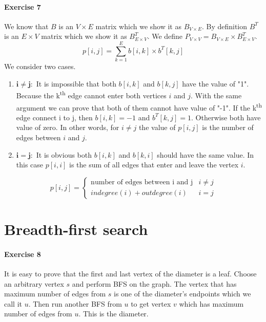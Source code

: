 \documentclass{book}
\begin{document}
	\paragraph{Exercise 7}
	We know that $B$ is an $V \times E$ matrix which we show it as $B_{V \times E}$. By definition $B^T$ is an $E \times V$ matrix which we show it as $B_{E \times V}^T$. We define $P_{V \times V} = B_{V \times E} \times B_{E \times V}^T$.
	\begin{equation*}
		p[i, j] = \sum_{k = 1}^{E}b[i, k] \times b^T[k, j]
	\end{equation*}
	We consider two cases.
	\begin{enumerate}
		\item $\boldsymbol{i \ne j:}$ It is impossible that both $b[i, k]$ and $b[k, j]$ have the value of "1". Because the k\textsuperscript{th} edge cannot enter both vertices $i$ and $j$. With the same argument we can prove that both of them cannot have value of "-1". If the k\textsuperscript{th} edge connect i to j, then $b[i, k] = -1$ and $b^T[k, j] = 1$. Otherwise both have value of zero. In other words, for $i \ne j$ the value of $p[i, j]$ is the number of edges between $i$ and $j$.
		\item $\boldsymbol{i = j:}$ It is obvious both $b[i, k]$ and $b[k, i]$ should have the same value. In this case $p[i, i]$ is the sum of all edges that enter and leave the vertex $i$.
	\end{enumerate}
	\begin{equation*}
		p[i, j] = \begin{cases}
		\text{number of edges between i and j} & i \ne j \\
		indegree(i) + outdegree(i) & i = j
		\end{cases}
	\end{equation*}
	\section{Breadth-first search}
	\paragraph{Exercise 8}
	It is easy to prove that the first and last vertex of the diameter is a leaf. Choose an arbitrary vertex $s$ and perform BFS on the graph. The vertex that has maximum number of edges from $s$ is one of the diameter's endpoints which we call it $u$. Then run another BFS from $u$ to get vertex $v$ which has maximum number of edges from $u$. This is the diameter.
\end{document}
